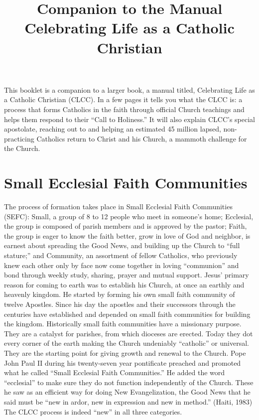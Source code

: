 \documentclass{article}
\title{\textbf{Companion to the Manual} \\ Celebrating Life as a Catholic Christian}
\date{}
\begin{document}
\maketitle


This booklet is a companion to a larger book, a manual titled, Celebrating Life
as a Catholic Christian (CLCC). In a few pages it tells you what the CLCC is: a
process that forms Catholics in the faith through official Church teachings and
helps them respond to their ``Call to Holiness.'' It will also explain CLCC's
special apostolate, reaching out to and helping an estimated 45 million lapsed,
non-practicing Catholics return to Christ and his Church, a mammoth challenge
for the Church.

\section{Small Ecclesial Faith Communities}

The process of formation takes place in Small Ecclesial Faith Communities
(SEFC): Small, a group of 8 to 12 people who meet in someone's home; Ecclesial,
the group is composed of parish members and is approved by the pastor; Faith,
the group is eager to know the faith better, grow in love of God and neighbor,
is earnest about spreading the Good News, and building up the Church to ``full
stature;'' and Community, an assortment of fellow Catholics, who previously knew
each other only by face now come together in loving ``communion'' and bond
through weekly study, sharing, prayer and mutual support.
Jesus' primary reason for coming to earth was to establish his Church, at once
an earthly and heavenly kingdom. He started by forming his own small faith
community of twelve Apostles. Since his day the apostles and their successors
through the centuries have established and depended on small faith communities
for building the kingdom. Historically small faith communities have a missionary
purpose. They are a catalyst for parishes, from which dioceses are
erected. Today they dot every corner of the earth making the Church undeniably
``catholic'' or universal. They are the starting point for giving growth and
renewal to the Church.
Pope John Paul II during his twenty-seven year pontificate preached and promoted
what he called ``Small Ecclesial Faith Communities.'' He added the word
``ecclesial'' to make sure they do not function independently of the
Church. These he saw as an efficient way for doing New Evangelization, the Good
News that he said must be ``new in ardor, new in expression and new in method.''
(Haiti, 1983) The CLCC process is indeed ``new'' in all three categories.
\end{document}
